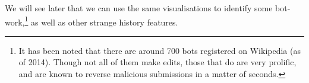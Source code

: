 We will see later that we can use the same visualisations to identify
some bot-work,\footnote{It has been noted that there are around 700
  bots registered on Wikipedia (as of 2014). Though not all of them
  make edits, those that do are very prolific, and are known to
  reverse malicious submissions in a matter of
  seconds.\cite{wiki-bots}\cite{bbc-bots}} as well as other strange
history features.




